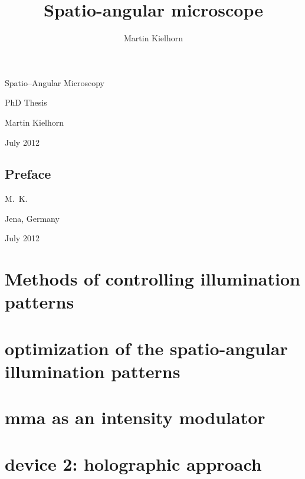 \documentclass[oneside,a4paper,12pt,BCOR20mm,DIV14]{scrbook}
\title{Spatio-angular microscope} %
\author{Martin Kielhorn}
\def\svgending{\ifx\pdfoutput\undefined%
  .eps_tex%
  \else%
  .pdf_tex%
  \fi}
\newcommand{\svginput}[2]{{\def\svgscale{#1}}}
\begin{document}
\listoftodos
\begin{titlepage}
  
  \hspace{-4cm}
  \svginput{1}{objective-trace}



  \vspace{-5cm}
  
  \hspace{4cm}\textsf{\Huge Spatio--Angular Microscopy}
  
  \vspace{2cm}
  \hspace{6cm}\textsf{\huge PhD Thesis}


  \vspace{3cm}
  \hspace{4cm}\textsf{\Large Martin Kielhorn}
  
  \vspace{1cm}
  \hspace{4cm}\textsf{\Large July 2012}
\end{titlepage}
\newpage

\section*{Preface}
\begin{flushright}
  M.~K.
\end{flushright}

\noindent
Jena, Germany

\noindent
July 2012

\newpage
\tableofcontents
\printnomenclature

\chapter{Methods of controlling illumination patterns}


\chapter{optimization of the spatio-angular illumination patterns}
\label{sec:optimization}
\chapter{mma as an intensity modulator}
\label{sec:mma}
\chapter{device 2: holographic approach}
\label{sec:holographic}
\end{document}
